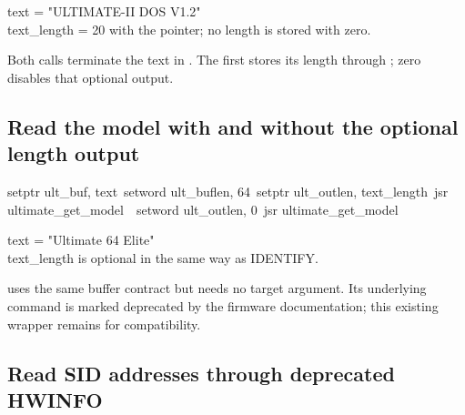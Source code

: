 \begin{resultbox}
text = "ULTIMATE-II DOS V1.2"\\
text_length = 20 with the pointer; no length is stored with zero.
\end{resultbox}

Both calls terminate the text in . The first stores its length
through ; zero disables that optional output.

\subsection*{Read the model with and without the optional length output}

\begin{listingbox}
\hspace*{2em}setptr ult\_buf, text\
\hspace*{2em}setword ult\_buflen, 64\
\hspace*{2em}setptr ult\_outlen, text\_length\
\hspace*{2em}jsr ultimate\_get\_model\
\
\hspace*{2em}setword ult\_outlen, 0\
\hspace*{2em}jsr ultimate\_get\_model
\end{listingbox}

\begin{resultbox}
text = "Ultimate 64 Elite"\\
text_length is optional in the same way as IDENTIFY.
\end{resultbox}

 uses the same buffer contract but needs no target
argument. Its underlying  command is marked
deprecated by the firmware documentation; this existing wrapper remains for
compatibility.

\subsection*{Read SID addresses through deprecated HWINFO}

